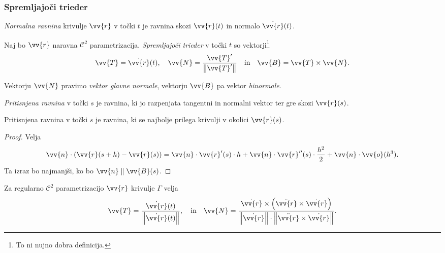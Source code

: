 \subsubsection{Spremljajoči trieder}

\begin{definicija}
\emph{Normalna ravnina}
krivulje $\vv{r}$ v točki $t$ je ravnina skozi $\vv{r}(t)$ in
normalo $\dot{\vv{r}}(t)$.
\end{definicija}

\begin{definicija}
Naj bo $\vv{r}$ naravna $\mathcal{C}^2$ parametrizacija.
\emph{Spremljajoči trieder} v točki $t$ so vektorji\footnote{To ni
nujno dobra definicija.}
\[
\vv{T} = \dot{\vv{r}}(t),
\quad
\vv{N} = \frac{\vv{T}'}{\norm{\vv{T}'}}
\quad \text{in} \quad
\vv{B} = \vv{T} \times \vv{N}.
\]
\end{definicija}

\begin{opomba}
Vektorju $\vv{N}$ pravimo \emph{vektor glavne normale}, vektorju
$\vv{B}$ pa vektor \emph{binormale}.
\end{opomba}

\begin{definicija}
\emph{Pritisnjena ravnina} v točki $s$ je ravnina, ki jo razpenjata
tangentni in normalni vektor ter gre skozi $\vv{r}(s)$.
\end{definicija}

\begin{trditev}
Pritisnjena ravnina v točki $s$ je ravnina, ki se najbolje prilega
krivulji v okolici $\vv{r}(s)$.
\end{trditev}

\begin{proof}
Velja
\[
\vv{n} \cdot (\vv{r}(s+h)-\vv{r}(s)) =
\vv{n} \cdot \vv{r}'(s) \cdot h +
\vv{n} \cdot \vv{r}''(s) \cdot \frac{h^2}{2} +
\vv{n} \cdot \vv{o}(h^3).
\]
Ta izraz bo najmanjši, ko bo $\vv{n} \parallel \vv{B}(s)$.
\end{proof}

\begin{trditev}
Za regularno $\mathcal{C}^2$ parametrizacijo $\vv{r}$ krivulje
$\Gamma$ velja
\[
\vv{T} = \frac{\dot{\vv{r}}(t)}{\norm{\dot{\vv{r}}(t)}},
\quad \text{in} \quad
\vv{N} =
\frac{\dot{\vv{r}} \times
\left(\ddot{\vv{r}} \times \dot{\vv{r}}\right)}
{\norm{\dot{\vv{r}}} \cdot
\norm{\ddot{\vv{r}} \times \dot{\vv{r}}}}.
\]
\end{trditev}


